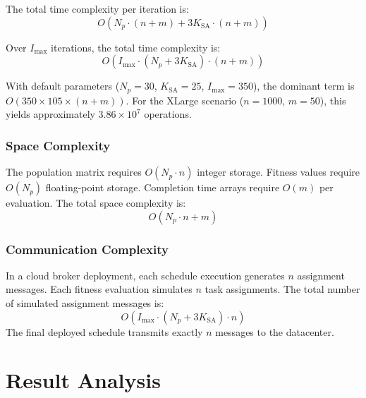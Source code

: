 \documentclass[conference]{IEEEtran}
\begin{document}
The total time complexity per iteration is:
\begin{equation}
    O\!\left(N_p \cdot (n + m) + 3 K_{\text{SA}} \cdot (n + m)\right)
    \label{eq:time_iter}
\end{equation}

Over $I_{\max}$ iterations, the total time complexity is:
\begin{equation}
    O\!\left(I_{\max} \cdot (N_p + 3 K_{\text{SA}}) \cdot (n + m)\right)
    \label{eq:time_total}
\end{equation}

With default parameters ($N_p = 30$, $K_{\text{SA}} = 25$, $I_{\max} = 350$),
the dominant term is $O(350 \times 105 \times (n + m))$.
For the XLarge scenario ($n = 1000$, $m = 50$), this yields approximately $3.86 \times 10^7$ operations.

\subsubsection{Space Complexity}
The population matrix requires $O(N_p \cdot n)$ integer storage.
Fitness values require $O(N_p)$ floating-point storage.
Completion time arrays require $O(m)$ per evaluation.
The total space complexity is:
\begin{equation}
    O(N_p \cdot n + m)
    \label{eq:space}
\end{equation}

\subsubsection{Communication Complexity}
In a cloud broker deployment, each schedule execution generates $n$ assignment messages.
Each fitness evaluation simulates $n$ task assignments.
The total number of simulated assignment messages is:
\begin{equation}
    O\!\left(I_{\max} \cdot (N_p + 3 K_{\text{SA}}) \cdot n\right)
    \label{eq:msg}
\end{equation}
The final deployed schedule transmits exactly $n$ messages to the datacenter.


\section{Result Analysis}
\end{document}
